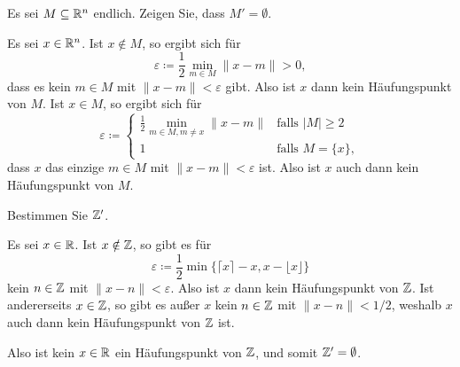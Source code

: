 \documentclass[a4paper,10pt]{article}
\begin{document}
\begin{question}
 Es sei $M \subseteq \mathbb{R}^n$ endlich. Zeigen Sie, dass $M' = \emptyset$.
\end{question}
\begin{solution}
 Es sei $x \in \mathbb{R}^n$. Ist $x \notin M$, so ergibt sich für
 \[
  \varepsilon \coloneqq \frac{1}{2} \min_{m \in M} \|x-m\| > 0,
 \]
 dass es kein $m \in M$ mit $\|x-m\| < \varepsilon$ gibt. Also ist $x$ dann kein Häufungspunkt von $M$. Ist $x \in M$, so ergibt sich für
 \[
  \varepsilon
  \coloneqq
  \begin{cases}
   \frac{1}{2} \min_{m \in M, m \neq x} \|x-m\| & \text{falls $|M| \geq 2$} \\
                                               1 & \text{falls $M = \{x\}$},
  \end{cases}
 \]
 dass $x$ das einzige $m \in M$ mit $\|x-m\| < \varepsilon$ ist. Also ist $x$ auch dann kein Häufungspunkt von $M$.
\end{solution}


\begin{question}
 Bestimmen Sie $\mathbb{Z}'$.
\end{question}
\begin{solution}
 Es sei $x \in \mathbb{R}$. Ist $x \notin \mathbb{Z}$, so gibt es für
 \[
  \varepsilon \coloneq \frac{1}{2} \min\{ \lceil x \rceil - x, x - \lfloor x \rfloor \}
 \]
 kein $n \in \mathbb{Z}$ mit $\|x-n\| < \varepsilon$. Also ist $x$ dann kein Häufungspunkt von $\mathbb{Z}$. Ist andererseits $x \in \mathbb{Z}$, so gibt es außer $x$ kein $n \in \mathbb{Z}$ mit $\|x-n\| < 1/2$, weshalb $x$ auch dann kein Häufungspunkt von $\mathbb{Z}$ ist.
 
 Also ist kein $x \in \mathbb{R}$ ein Häufungspunkt von $\mathbb{Z}$, und somit $\mathbb{Z}' = \emptyset$.
\end{solution}
\end{document}
